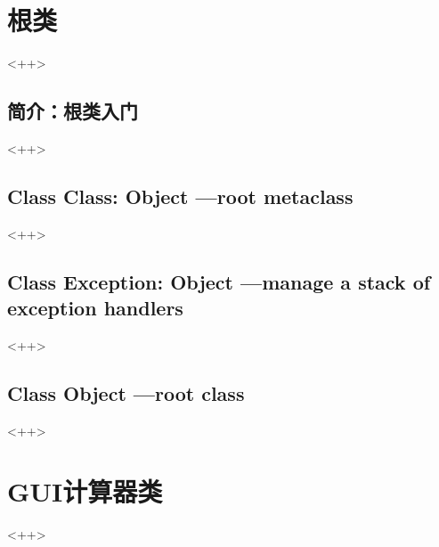 \section{根类}
<++>

\subsection{简介：根类入门}
<++>

\subsection{Class Class: Object ---root metaclass}
<++>

\subsection{Class Exception: Object ---manage a stack of exception handlers}
<++>

\subsection{Class Object ---root class}
<++>

\section{GUI计算器类}
<++>

